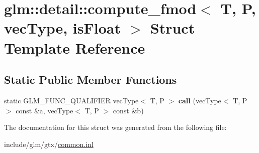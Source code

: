 \hypertarget{structglm_1_1detail_1_1compute__fmod}{}\section{glm\+:\+:detail\+:\+:compute\+\_\+fmod$<$ T, P, vec\+Type, is\+Float $>$ Struct Template Reference}
\label{structglm_1_1detail_1_1compute__fmod}
\subsection*{Static Public Member Functions}
\begin{DoxyCompactItemize}
\item 
\mbox{\label{structglm_1_1detail_1_1compute__fmod_add2143b71c7bfb64b030b4eed6ea3ef6}} 
static G\+L\+M\+\_\+\+F\+U\+N\+C\+\_\+\+Q\+U\+A\+L\+I\+F\+I\+ER vec\+Type$<$ T, P $>$ {\bfseries call} (vec\+Type$<$ T, P $>$ const \&a, vec\+Type$<$ T, P $>$ const \&b)
\end{DoxyCompactItemize}


The documentation for this struct was generated from the following file\+:\begin{DoxyCompactItemize}
\item 
include/glm/gtx/\hyperlink{common_8inl}{common.\+inl}\end{DoxyCompactItemize}
